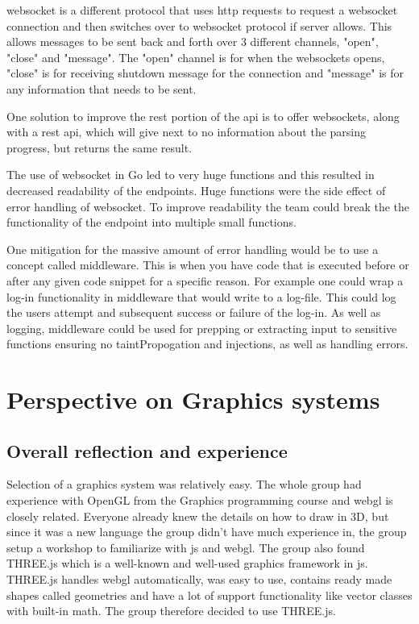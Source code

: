 \Gls{websocket} is a different protocol that uses \gls{http} requests to request a \Gls{websocket} connection and then switches over to \Gls{websocket} protocol if server allows. This allows messages to be sent back and forth over 3 different channels, "open", "close" and "message". The "open" channel is for when the \Glspl{websocket} opens, "close" is for receiving shutdown message for the connection and "message" is for any information that needs to be sent. 

One solution to improve the \gls{rest} portion of the \gls{api} is to offer \Glspl{websocket}, along with a \gls{rest} \gls{api}, which will give next to no information about the parsing progress, but returns the same result.

The use of \gls{websocket} in Go led to very huge functions and this resulted in decreased readability of the endpoints. Huge functions were the side effect of error handling of \gls{websocket}. To improve readability the team could break the the functionality of the endpoint into multiple small functions.

One mitigation for the massive amount of error handling would be to use a concept called middleware. This is when you have code that is executed before or after any given code snippet for a specific reason. For example one could wrap a log-in functionality in middleware that would write to a log-file. This could log the users attempt and subsequent success or failure of the log-in. As well as logging, middleware could be used for prepping or extracting input to sensitive functions ensuring no \gls{taintPropogation} and injections, as well as handling errors.

\section{Perspective on Graphics systems}
\subsection{Overall reflection and experience}
Selection of a graphics system was relatively easy. The whole group had experience with OpenGL from the Graphics programming course \cite{course:graphics} and \gls{webgl} is closely related. Everyone already knew the details on how to draw in 3D, but since it was a new language the group didn't have much experience in, the group setup a workshop to familiarize with \Gls{js} and \gls{webgl}. The group also found THREE.js which is a well-known and well-used graphics framework in \Gls{js}. THREE.js handles \gls{webgl} automatically, was easy to use, contains ready made shapes called geometries and have a lot of support functionality like vector classes with built-in math. The group therefore decided to use THREE.js.

